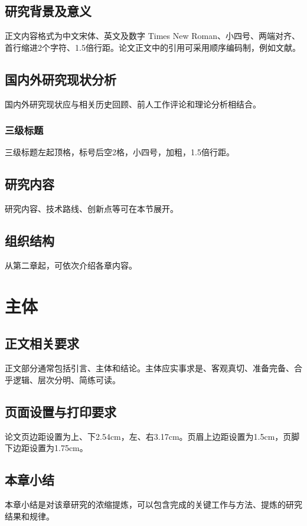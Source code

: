 \documentclass{hznu-thesis}
\begin{document}
\section{研究背景及意义}
正文内容格式为中文宋体、英文及数字 Times New Roman、小四号、两端对齐、首行缩进2个字符、1.5倍行距。论文正文中的引用可采用顺序编码制，例如文献\cite{ma2018review,chen2022tensorf}。

\section{国内外研究现状分析}
国内外研究现状应与相关历史回顾、前人工作评论和理论分析相结合。

\subsection{三级标题}
三级标题左起顶格，标号后空2格，小四号，加粗，1.5倍行距。

\section{研究内容}
研究内容、技术路线、创新点等可在本节展开。

\section{组织结构}
从第二章起，可依次介绍各章内容。

\chapter{主体}
\section{正文相关要求}
正文部分通常包括引言、主体和结论。主体应实事求是、客观真切、准备完备、合乎逻辑、层次分明、简练可读。

\section{页面设置与打印要求}
论文页边距设置为上、下2.54cm，左、右3.17cm。页眉上边距设置为1.5cm，页脚下边距设置为1.75cm。

\section{本章小结}
本章小结是对该章研究的浓缩提炼，可以包含完成的关键工作与方法、提炼的研究结果和规律。
\end{document}
